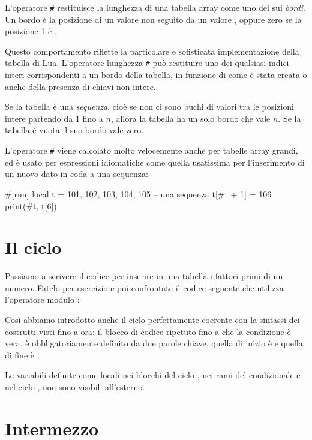 L'operatore \texttt{\#} restituisce la lunghezza di una tabella array come uno
dei sui \emph{bordi}. Un bordo è la posizione di un valore non  seguito
da un valore , oppure zero se la posizione 1 è .

Questo comportamento riflette la particolare e sofisticata implementazione della
tabella di Lua. L'operatore lunghezza \texttt{\#} può restituire uno dei
qualsiasi indici interi corrispondenti a un bordo della tabella, in funzione di
come è stata creata o anche della presenza di chiavi non intere.

Se la tabella è una \emph{sequenza}, cioè se non ci sono buchi di valori tra le
posizioni intere partendo da 1 fino a \( n \), allora la tabella ha un solo
bordo che vale \( n \). Se la tabella è vuota il suo bordo vale zero.

L'operatore \texttt{\#} viene calcolato molto velocemente anche per tabelle
array grandi, ed è usato per espressioni idiomatiche come quella usatissima per
l'inserimento di un nuovo dato in coda a una sequenza:
\begin{lines}
#[run]
local t = {101, 102, 103, 104, 105} -- una sequenza
t[#t + 1] = 106
print(#t, t[6])
\end{lines}


\section{Il ciclo }
\label{secCicloWhile}

Passiamo a scrivere il codice per inserire in una tabella i fattori primi di un
numero. Fatelo per esercizio e poi confrontate il codice seguente che utilizza
l'operatore modulo \key{\%}:

Così abbiamo introdotto anche il ciclo  perfettamente coerente con
la sintassi dei costrutti visti fino a ora: il blocco di codice ripetuto fino a
che la condizione è vera, è obbligatoriamente definito da due parole chiave,
quella di inizio è  e quella di fine è .

Le variabili definite come locali nei blocchi del ciclo , nei rami del
condizionale  e nel ciclo , non sono visibili all'esterno.


\section{Intermezzo}

